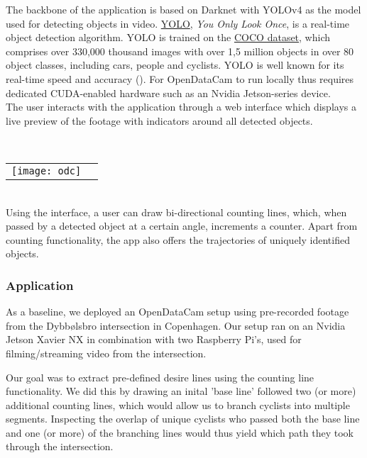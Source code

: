 The backbone of the application is based on Darknet with YOLOv4 as the model used for detecting objects in video.
\href{https://pjreddie.com/darknet/yolo/}{YOLO}, \textit{You Only Look Once}, is a real-time object detection algorithm. 
YOLO is trained on the \href{https://cocodataset.org}{COCO dataset}, which comprises over 330,000 thousand images
with over 1,5 million objects in over 80 object classes, including cars, people and cyclists. 
YOLO is well known for its real-time speed and accuracy (\cite{redmon2016look}). 
For OpenDataCam to run locally thus requires dedicated CUDA-enabled hardware such as an Nvidia Jetson-series device. 
\ \\

The user interacts with the application through a web interface which displays a live preview of the footage with
indicators around all detected objects.

\ \\
\raggedbottom
\noindent
\begin{tabular}{@{}cc}
\texttt{[image: odc]} 
\end{tabular}
\ \\

Using the interface, a user can draw bi-directional counting lines, which, when passed by a detected object at a certain angle, 
increments a counter. Apart from counting functionality, the app also offers the trajectories of uniquely identified objects. 

\raggedbottom
\subsubsection{Application}
As a baseline, we deployed an OpenDataCam setup using pre-recorded footage from the Dybbølsbro intersection in Copenhagen.
Our setup ran on an Nvidia Jetson Xavier NX in combination with two Raspberry Pi's, used for filming/streaming video from the intersection.

Our goal was to extract pre-defined desire lines using the counting line functionality. We did this by drawing an inital 
'base line' followed two (or more) additional counting lines, which would allow us to branch cyclists into multiple segments. Inspecting the
overlap of unique cyclists who passed both the base line and one (or more) of the branching lines would thus yield which path
they took through the intersection. 
\ \\

